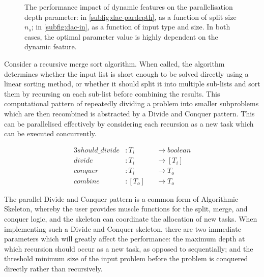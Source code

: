 \begin{figure}[!b]
\centering

\caption{The performance impact of dynamic features on the
  parallelisation depth parameter: in \ref{subfig:dac-pardepth}, as a
  function of split size $n_s$; in \ref{subfig:dac-in}, as a function
  of input type and size. In both cases, the optimal parameter value
  is highly dependent on the dynamic feature.}
\label{fig:dac}
\end{figure}

Consider a recursive merge sort algorithm. When called, the algorithm
determines whether the input list is short enough to be solved
directly using a linear sorting method, or whether it should split it
into multiple sub-lists and sort them by recursing on each sub-list
before combining the results. This computational pattern of repeatedly
dividing a problem into smaller subproblems which are then recombined
is abstracted by a Divide and Conquer pattern. This can be
parallelised effectively by considering each recursion as a new task
which can be executed concurrently.



\begin{alignat*}{3}
should\_divide &: T_i & &\rightarrow boolean\\
divide &: T_i & &\rightarrow [T_i]\\
conquer &: T_i & &\rightarrow T_o\\
combine &: [T_o] & &\rightarrow T_o
\end{alignat*}

The parallel Divide and Conquer pattern is a common form of
Algorithmic Skeleton, whereby the user provides muscle functions for
the split, merge, and conquer logic, and the skeleton can coordinate
the allocation of new tasks. When implementing such a Divide and
Conquer skeleton, there are two immediate parameters which will
greatly affect the performance: the maximum depth at which recursion
should occur as a new task, as opposed to sequentially; and the
threshold minimum size of the input problem before the problem is
conquered directly rather than recursively.


